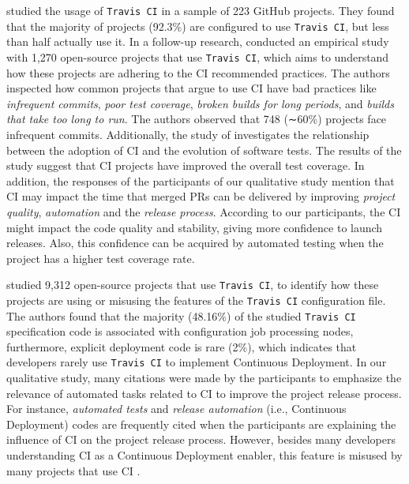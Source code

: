 \cite{Vasilescu2015-tj} studied the usage of
\texttt{Travis CI} in a sample of 223 GitHub projects.
They found that the majority of projects (92.3\%) are configured to use
\texttt{Travis CI}, but less than half actually use it. In a follow-up research, \cite{felidre2019continuous} conducted an empirical study with 1,270 open-source projects that use \texttt{Travis CI}, which aims to understand how these projects are adhering to the CI recommended practices. The authors inspected how common projects that argue to use CI have bad practices like \textit{infrequent commits}, \textit{poor test coverage}, \textit{broken builds for long periods}, and \textit{builds that take too long to run}. The authors observed that 748 (∼60\%) projects face infrequent commits. 
Additionally, the study of \cite{nery2019empirical} investigates the relationship between the adoption of CI and the evolution of software tests. 
The results of the study suggest that CI projects have improved the overall test coverage.
In addition, the responses of the participants of our qualitative study mention that CI may impact the time that merged PRs can be delivered by improving \textit{project quality}, \textit{automation} and the \textit{release process}. According to our participants, the CI might impact the code quality and stability, giving more confidence to launch releases. Also, this confidence can be acquired by automated testing when the project has a higher test coverage rate.

\cite{gallaba2018use} studied 9,312 open-source projects that use \texttt{Travis CI}, to identify how these projects are using or misusing the features of the \texttt{Travis CI} configuration file. The authors found that the majority (48.16\%) of the studied \texttt{Travis CI} specification code is associated with configuration job processing nodes, furthermore, explicit deployment code is rare (2\%), which indicates that developers rarely use \texttt{Travis CI} to implement Continuous Deployment. In our qualitative study, many citations were made by the participants to emphasize the relevance of automated tasks related to CI to improve the project release process. For instance, \textit{automated tests} and \textit{release automation} (i.e., Continuous Deployment) codes are frequently cited when the participants are explaining the influence of CI on the project release process. However, besides many developers understanding CI as a Continuous Deployment enabler, this feature is misused by many projects that use CI \citep{gallaba2018use}.
